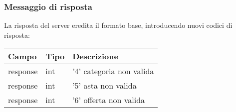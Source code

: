 \subsubsection{Messaggio di risposta}
La risposta del server eredita il formato base, introducendo nuovi codici di risposta:\\
\begin{tabular}{|l | l | l |}
\hline
Campo & Tipo & Descrizione \\ \hline
response & int & '4' categoria non valida \\ \hline
response & int & '5' asta non valida\\ \hline
response & int &  '6' offerta non valida\\ \hline
\end{tabular} \\